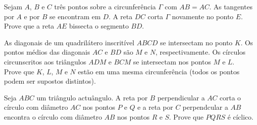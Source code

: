 \documentclass[final, 10pt, a4paper]{article}
\begin{document}
	\begin{prob}
	Sejam $A$, $B$ e $C$ três pontos sobre a circunferência $\Gamma$ com $AB = AC$. As tangentes por $A$ e por $B$ se encontram em $D$. A reta $DC$ corta $\Gamma$ novamente no ponto $E$. Prove que a reta $AE$ bissecta o segmento $BD$.
	\end{prob}

	\begin{prob}
		As diagonais de um quadrilátero inscritível $ABCD$ se intersectam no ponto $K$. Os pontos médios das diagonais $AC$ e $BD$ são $M$ e $N$, respectivamente. Os círculos circunscritos aos triângulos $ADM$ e $BCM$ se intersectam nos pontos $M$ e $L$. Prove que $K$, $L$, $M$ e $N$ estão em uma mesma circunferência (todos os pontos podem ser supostos distintos).
	\end{prob}

	\begin{prob}
		Seja $ABC$ um triângulo actuângulo. A reta por $B$ perpendicular a $AC$ corta o círculo com diâmetro $AC$ nos pontos $P$ e $Q$ e a reta por $C$ perpendcular a $AB$ encontra o círculo com diâmetro $AB$ nos pontos $R$ e $S$. Prove que $PQRS$ é cíclico.
	\end{prob}
\end{document}
